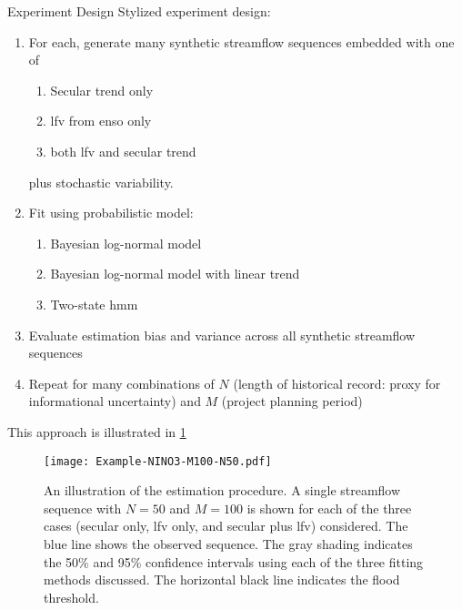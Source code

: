 \begin{block}{Experiment Design}
      Stylized experiment design:
      \begin{enumerate}
        \item For each, generate many synthetic streamflow sequences embedded with one of
        \begin{enumerate}
          \item Secular trend only
          \item \gls{lfv} from \gls{enso} only
          \item both \gls{lfv} and secular trend
        \end{enumerate}
        plus stochastic variability.
        \item Fit using probabilistic model:
        \begin{enumerate}
          \item Bayesian log-normal model
          \item Bayesian log-normal model with linear trend
          \item Two-state \gls{hmm}
        \end{enumerate}
        \item Evaluate estimation bias and variance across all synthetic streamflow sequences
        \item Repeat for many combinations of $N$ (length of historical record: proxy for informational uncertainty) and $M$ (project planning period)
      \end{enumerate}
      This approach is illustrated in \cref{fig:example-fit}
      \begin{figure}
        \texttt{[image: Example-NINO3-M100-N50.pdf]}
        \caption{
          An illustration of the estimation procedure.
          A single streamflow sequence with $N=50$ and $M=100$ is shown for each of the three cases (secular only, \gls{lfv} only, and secular plus \gls{lfv}) considered.
          The blue line shows the observed sequence.
          The gray shading indicates the 50\% and 95\% confidence intervals using each of the three fitting methods discussed.
          The horizontal black line indicates the flood threshold.
        }\label{fig:example-fit}
      \end{figure}
\end{block}